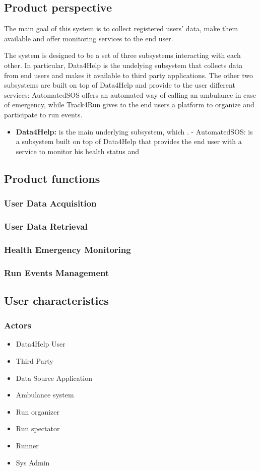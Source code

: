 \subsection{Product perspective}
The main goal of this system is to collect registered users' data, make them available and offer monitoring services to the end user.

The system is designed to be a set of three subsystems interacting with each other. In particular, Data4Help is the undelying subsystem that collects data from end users and makes it available to third party applications. 
The other two subsystems are built on top of Data4Help and provide to the user different services: AutomatedSOS offers an automated way of calling an ambulance in case of emergency, while Track4Run gives to the end users a platform to organize and participate to run events.

\begin{itemize}
\item \textbf{Data4Help:} is the main underlying subsystem, which .
- AutomatedSOS: is a subsystem built on top of Data4Help that provides the end user with a service to monitor his health status and 
\end{itemize}

\subsection{Product functions}

\subsubsection{User Data Acquisition}
\subsubsection{User Data Retrieval}
\subsubsection{Health Emergency Monitoring}
\subsubsection{Run Events Management}

\subsection{User characteristics}
\subsubsection{Actors}
\begin{itemize}
\item Data4Help User
\item Third Party
\item Data Source Application
\item Ambulance system
\item Run organizer
\item Run spectator
\item Runner
\item Sys Admin
\end{itemize}
